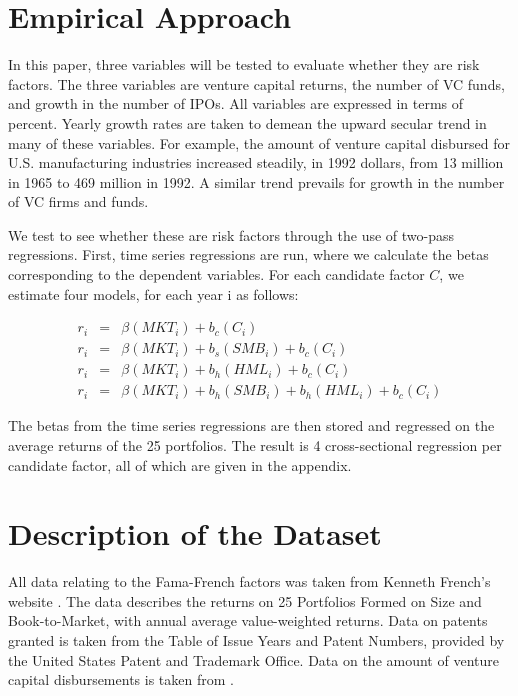 \documentclass[12pt]{article}
\begin{document}
\section{Empirical Approach}

In this paper, three variables will be tested to evaluate whether they are risk factors. The three variables are venture capital returns, the number of VC funds, and growth in the number of IPOs. All variables are expressed in terms of percent. Yearly growth rates are taken to demean the upward secular trend in many of these variables. For example, the amount of venture capital disbursed for U.S. manufacturing industries increased steadily, in 1992 dollars, from 13 million in 1965 to 469 million in 1992. A similar trend prevails for growth in the number of VC firms and funds.

We test to see whether these are risk factors through the use of two-pass regressions. First, time series regressions are run, where we calculate the betas corresponding to the dependent variables. For each candidate factor $C$, we estimate four models, for each year i as follows:

\begin{eqnarray}
r_i     	& = &   \beta ({MKT}_i) + b_c ({C}_i)     			 	\\
r_i     	& = &   \beta ({MKT}_i) + b_s ({SMB}_i) + b_c ({C}_i)  		\\
r_i 	  	& = &   \beta ({MKT}_i) + b_h ({HML}_i) + b_c ({C}_i)			\\
r_i	  		& = &   \beta ({MKT}_i) + b_h ({SMB}_i) + b_h ({HML}_i) + b_c ({C}_i)
\end{eqnarray}

The betas from the time series regressions are then stored and regressed on the average returns of the 25 portfolios. The result is 4 cross-sectional regression per candidate factor, all of which are given in the appendix.



\section{Description of the Dataset}

All data relating to the Fama-French factors was taken from Kenneth French's website \citep{french_data}. The data describes the returns on 25 Portfolios Formed on Size and Book-to-Market, with annual average value-weighted returns.  Data on patents granted is taken from the Table of Issue Years and Patent Numbers, provided by the United States Patent and Trademark Office. Data on the amount of venture capital disbursements is taken from \cite{lerner1998}. 
\end{document}
